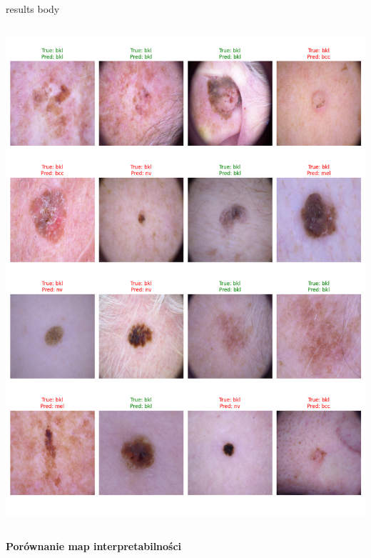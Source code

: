 \documentclass[final]{beamer}
\begin{document}
\begin{frame}[t]
\begin{columns}[T]
\begin{column}{.49\linewidth}
{\begin{beamercolorbox}[wd=\linewidth,dp=0.3cm]{results body}
\begin{columns}[T]
\begin{column}{.48\linewidth}
                        \includegraphics[width=\linewidth]{figures/sample_predictions_cnn.png}
                    \end{column}
                \end{columns}
                
                \vspace{0.15cm}
                \textbf{Porównanie map interpretabilności}
                \vspace{0.1cm}
                

\end{beamercolorbox}}
\end{column}
\end{columns}
\end{frame}
\end{document}
